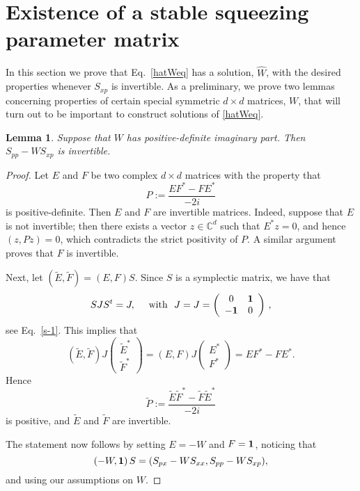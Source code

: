 \documentclass[12pt]{article}
\newtheorem{lemma}[theorem]{Lemma}
\begin{document}
\section{Existence of a stable squeezing parameter matrix}\label{sec:WM}
In this section we prove that Eq.~\eqref{hatWeq} has a solution, $\widehat{W}$, with the desired properties whenever $S_{xp}$ is invertible. As a preliminary, we prove two lemmas concerning properties of certain special symmetric $d \times d$ matrices, $W$, that will turn out to be important to construct solutions of \eqref{hatWeq}.

\begin{lemma}
\label{lem:invertible}
Suppose that $W$ has positive-definite imaginary part. Then $S_{pp} - WS_{xp}$ is invertible.
\end{lemma}
\begin{proof}
Let $E$ and $F$ be two complex $d\times d$ matrices with the property that 
$$
P:=\frac{E F^* - F E^*}{-2 i}
$$
is positive-definite. Then $E$ and $F$ are invertible matrices. Indeed, suppose that $E$ is not invertible; then there exists a vector $z \in \mathbb{C}^{d}$ such that $E^*z = 0$, and hence $(z,Pz) = 0$, which contradicts the strict positivity of $P$. 
A similar argument proves that $F$ is invertible.

Next, let $(\tilde{E}, \tilde{F}) = (E,F) S$. Since $S$ is a symplectic matrix, we have that
$$SJS^t = J, \quad \text{ with }\,\, J=J =\left( \begin{array}{cc}
		0 & {\bf{1}} \\
		-{\bf{1}} & 0 
		\end{array} \right)\,,$$
 see Eq.~\eqref{s-1}. This implies that 
$$
\left( \tilde{E}, \tilde{F} \right) J \left( \begin{array}{r} 
						\tilde{E}^* \\
						\tilde{F}^*
					\end{array} \right) = \left( E, F \right) J \left( \begin{array}{r} 
						E^* \\
						F^*
					\end{array} \right) = EF^* - F E^*.
$$
Hence 
$$
\tilde{P}:=\frac{\tilde{E} \tilde{F}^* - \tilde{F} \tilde{E}^*}{-2 i}
$$
is positive, and  $\tilde{E}$ and $\tilde{F}$ are invertible.

The statement now follows by setting $E=-W$ and $F={\bf{1}}$, noticing that
$$
\left(-W, {\bf{1}}\right) S = (S_{px} - WS_{xx}, S_{pp} -WS_{xp}),
$$
and using our assumptions on $W$. 
\end{proof}
\end{document}

